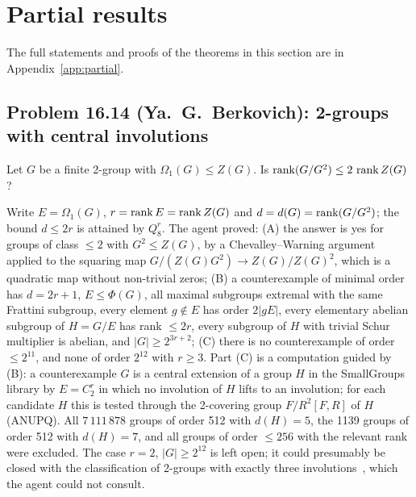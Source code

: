 \section{Partial results}\label{sec:partial}

The full statements and proofs of the theorems in this section are in Appendix~\ref{app:partial}.

\subsection{Problem 16.14 (Ya.~G.~Berkovich): 2-groups with central involutions}
\begin{problem}[16.14]
Let $G$ be a finite 2-group with $\Omega_1(G)\le Z(G)$. Is $\operatorname{rank}(G/G^2)\le 2\,\operatorname{rank} Z(G)$?
\end{problem}
Write $E=\Omega_1(G)$, $r=\operatorname{rank} E=\operatorname{rank} Z(G)$ and $d=d(G)=\operatorname{rank}(G/G^2)$; the bound $d\le 2r$ is attained by $Q_8^r$.
The agent proved: (A) the answer is yes for groups of class $\le 2$ with $G^2\le Z(G)$, by a Chevalley--Warning
argument applied to the squaring map $G/(Z(G)G^2)\to Z(G)/Z(G)^2$, which is a quadratic map without non-trivial
zeros; (B) a counterexample of minimal order has $d=2r+1$, $E\le\Phi(G)$, all maximal subgroups extremal with
the same Frattini subgroup, every element $g\notin E$ has order $2|gE|$, every elementary abelian subgroup of
$H=G/E$ has rank $\le 2r$, every subgroup of $H$ with trivial Schur multiplier is abelian, and $|G|\ge 2^{3r+2}$;
(C) there is no counterexample of order $\le 2^{11}$, and none of order $2^{12}$ with $r\ge 3$. Part (C) is a
computation guided by (B): a counterexample $G$ is a central extension of a group $H$ in the SmallGroups library
by $E=C_2^r$ in which no involution of $H$ lifts to an involution; for each candidate $H$ this is tested through
the 2-covering group $F/R^2[F,R]$ of $H$ (ANUPQ). All $7\,111\,878$ groups of order 512 with $d(H)=5$, the 1139 groups
of order 512 with $d(H)=7$, and all groups of order $\le 256$ with the relevant rank were excluded. The case
$r=2$, $|G|\ge 2^{12}$ is left open; it could presumably be closed with the classification of 2-groups with
exactly three involutions~\cite{Konvisser,Janko}, which the agent could not consult.

